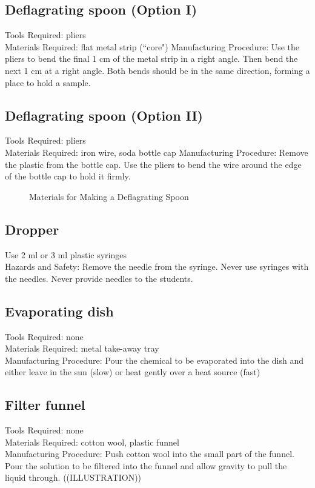 \subsection*{Deflagrating spoon (Option I)}
Tools Required: pliers\\
Materials Required: flat metal strip (``core")
Manufacturing Procedure: Use the pliers to bend the final 1 cm of the metal strip in a right angle. Then bend the next 1 cm at a right angle. Both bends should be in the same direction, forming a place to hold a sample.



\subsection*{Deflagrating spoon (Option II)}
Tools Required: pliers\\
Materials Required: iron wire, soda bottle cap
Manufacturing Procedure: Remove the plastic from the bottle cap. Use the pliers to bend the wire around the edge of the bottle cap to hold it firmly.



\begin{figure}[h]
\begin{center}
\def\svgwidth{50pt}

\caption{Materials for Making a Deflagrating Spoon}
\end{center}
\end{figure}

\subsection*{Dropper}
Use 2 ml or 3 ml plastic syringes
\\Hazards and Safety: Remove the needle from the syringe. Never use syringes with the needles. Never provide needles to the students.

\subsection*{Evaporating dish}
Tools Required: none\\
Materials Required: metal take-away tray\\
Manufacturing Procedure: Pour the chemical to be evaporated into the dish and either leave in the sun (slow) or heat gently over a heat source (fast)

\subsection*{Filter funnel}
Tools Required: none\\
Materials Required: cotton wool, plastic funnel\\
Manufacturing Procedure: Push cotton wool into the small part of the funnel. Pour the solution to be filtered into the funnel and allow gravity to pull the liquid through. ((ILLUSTRATION))

